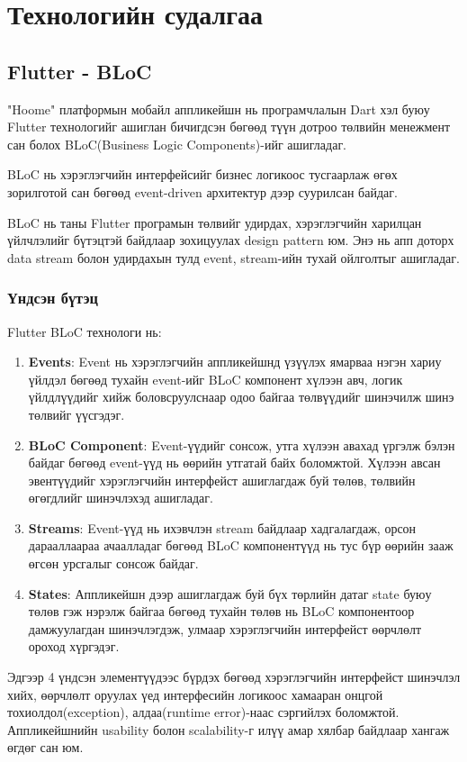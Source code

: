 \chapter{Технологийн судалгаа}
\section{Flutter - BLoC}
"Hoome" платформын мобайл аппликейшн нь програмчлалын Dart хэл буюу Flutter технологийг ашиглан бичигдсэн бөгөөд түүн дотроо төлвийн менежмент сан болох BLoC(Business Logic Components)-ийг ашигладаг. 

BLoC нь хэрэглэгчийн интерфейсийг бизнес логикоос тусгаарлаж өгөх зорилготой сан бөгөөд event-driven архитектур дээр суурилсан байдаг. 

BLoC нь таны Flutter програмын төлвийг удирдах, хэрэглэгчийн харилцан үйлчлэлийг бүтэцтэй байдлаар зохицуулах design pattern юм. Энэ нь апп доторх data stream болон удирдахын тулд event, stream-ийн тухай ойлголтыг ашигладаг.

\subsection{Үндсэн бүтэц}

Flutter BLoC технологи нь:

\begin{enumerate}
  \item \textbf{Events}: Event нь хэрэглэгчийн аппликейшнд үзүүлэх ямарваа нэгэн хариу үйлдэл бөгөөд тухайн event-ийг BLoC компонент хүлээн авч, логик үйлдлүүдийг хийж боловсруулснаар одоо байгаа төлвүүдийг шинэчилж шинэ төлвийг үүсгэдэг.
  \item \textbf{BLoC Component}: Event-үүдийг сонсож, утга хүлээн авахад үргэлж бэлэн байдаг бөгөөд event-үүд нь өөрийн утгатай байх боломжтой. Хүлээн авсан эвентүүдийг хэрэглэгчийн интерфейст ашиглагдаж буй төлөв, төлвийн өгөгдлийг шинэчлэхэд ашигладаг.
  \item \textbf{Streams}: Event-үүд нь ихэвчлэн stream байдлаар хадгалагдаж, орсон дарааллаараа ачаалладаг бөгөөд BLoC компонентүүд нь тус бүр өөрийн зааж өгсөн урсгалыг сонсож байдаг.
  \item \textbf{States}: Аппликейшн дээр ашиглагдаж буй бүх төрлийн датаг state буюу төлөв гэж нэрэлж байгаа бөгөөд тухайн төлөв нь BLoC компонентоор дамжуулагдан шинэчлэгдэж, улмаар хэрэглэгчийн интерфейст өөрчлөлт ороход хүргэдэг. 
\end{enumerate}

Эдгээр 4 үндсэн элементүүдээс бүрдэх бөгөөд хэрэглэгчийн интерфейст шинэчлэл хийх, өөрчлөлт оруулах үед интерфесийн логикоос хамааран онцгой тохиолдол(exception), алдаа(runtime error)-наас сэргийлэх боломжтой. Аппликейшнийн usability болон scalability-г илүү амар хялбар байдлаар хангаж өгдөг сан юм. 

